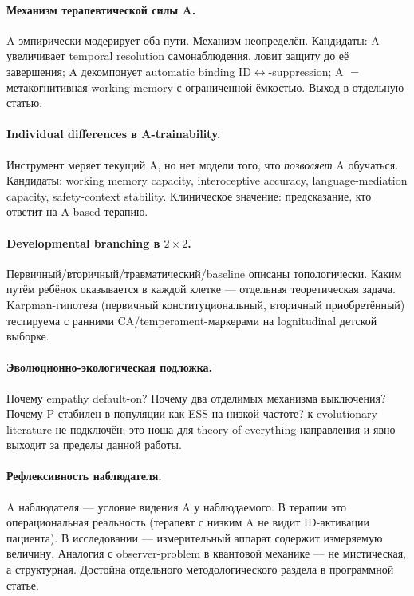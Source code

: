 \paragraph{Механизм терапевтической силы A.} A эмпирически модерирует оба пути. Механизм неопределён. Кандидаты: A увеличивает temporal resolution самонаблюдения, ловит защиту до её завершения; A декомпонует automatic binding ID$\leftrightarrow$\EAF{}-suppression; A $=$ метакогнитивная working memory с ограниченной ёмкостью. Выход в отдельную статью.

\paragraph{Individual differences в A-trainability.} Инструмент меряет текущий A, но нет модели того, что \emph{позволяет} A обучаться. Кандидаты: working memory capacity, interoceptive accuracy, language-mediation capacity, safety-context stability. Клиническое значение: предсказание, кто ответит на A-based терапию.

\paragraph{Developmental branching в $2\times 2$.} Первичный/вторичный/травматический/baseline описаны топологически. Каким путём ребёнок оказывается в каждой клетке --- отдельная теоретическая задача. Karpman-гипотеза (первичный конституциональный, вторичный приобретённый) тестируема с ранними CA/temperament-маркерами на lognitudinal детской выборке.

\paragraph{Эволюционно-экологическая подложка.} Почему empathy default-on? Почему два отделимых механизма выключения? Почему P стабилен в популяции как ESS на низкой частоте? \DEIC{} к evolutionary literature не подключён; это ноша для theory-of-everything направления и явно выходит за пределы данной работы.

\paragraph{Рефлексивность наблюдателя.} A наблюдателя --- условие видения A у наблюдаемого. В терапии это операциональная реальность (терапевт с низким A не видит ID-активации пациента). В исследовании --- измерительный аппарат содержит измеряемую величину. Аналогия с observer-problem в квантовой механике --- не мистическая, а структурная. Достойна отдельного методологического раздела в программной статье.
